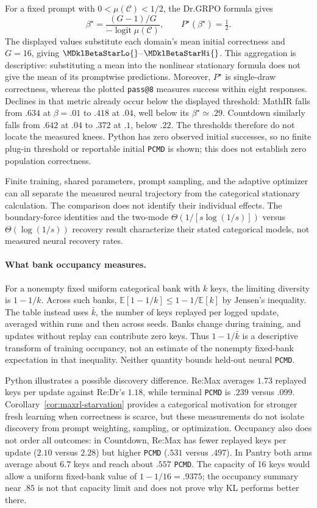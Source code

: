 \documentclass{article}
\newcommand{\1}{\mathbf 1}
\newcommand{\E}{\mathbb E}
\newcommand{\pmd}{\texttt{PCMD}}
\theoremstyle{remark}
\theoremstyle{definition}
\theoremstyle{plain}
\begin{document}
For a fixed prompt with $0<\mu(\mathcal C)<1/2$, the Dr.GRPO formula gives
\[
  \beta^\star=\frac{(G-1)/G}{-\operatorname{logit}\mu(\mathcal C)},
  \qquad P^\star(\beta^\star)=\tfrac12.
\]
The displayed values substitute each domain's mean initial correctness
and $G=16$, giving $\MDklBetaStarLo{}$--$\MDklBetaStarHi{}$.
This aggregation is descriptive: substituting a mean into the nonlinear
stationary formula does not give the mean of its promptwise predictions.
Moreover, $P^\star$ is single-draw correctness, whereas the plotted
\texttt{pass@8} measures success within eight responses. Declines in that
metric already occur below the displayed threshold: MathIR falls from
$.634$ at $\beta=.01$ to $.418$ at $.04$, well below its
$\beta^\star\simeq.29$. Countdown similarly falls from $.642$ at $.04$
to $.372$ at $.1$, below $.22$. The thresholds therefore do not locate
the measured knees. Python has zero observed initial successes, so no
finite plug-in threshold or reportable initial \pmd{} is shown; this
does not establish zero population correctness.

Finite training, shared parameters, prompt sampling, and the adaptive
optimizer can all separate the measured neural trajectory from the
categorical stationary calculation. The comparison does not identify their
individual effects. The boundary-force identities and the two-mode
$\Theta(1/[s\log(1/s)])$ versus $\Theta(\log(1/s))$ recovery result
characterize their stated categorical models, not measured neural recovery
rates.

\paragraph{What bank occupancy measures.}
For a nonempty fixed uniform categorical bank with $k$ keys, the limiting
diversity is $1-1/k$. Across such banks,
$\E[1-1/k]\le1-1/\E[k]$ by Jensen's inequality. The table instead uses
$\bar k$, the number of keys replayed per logged update, averaged within
runs and then across seeds. Banks change during training, and updates
without replay can contribute zero keys. Thus $1-1/\bar k$ is a
descriptive transform of training occupancy, not an estimate of the
nonempty fixed-bank expectation in that inequality. Neither quantity
bounds held-out neural \pmd{}.

Python illustrates a possible discovery difference. Re:Max averages
$1.73$ replayed keys per update against Re:Dr's $1.18$, while terminal
\pmd{} is $.239$ versus $.099$. Corollary~\ref{cor:maxrl-starvation}
provides a categorical motivation for stronger fresh learning when
correctness is scarce, but these measurements do not isolate discovery
from prompt weighting, sampling, or optimization. Occupancy also does not
order all outcomes: in Countdown, Re:Max has fewer replayed keys per
update ($2.10$ versus $2.28$) but higher \pmd{} ($.531$ versus $.497$).
In Pantry both arms average about $6.7$ keys and reach about $.557$ \pmd{}.
The capacity of 16 keys would allow a uniform fixed-bank value of
$1-1/16=.9375$; the occupancy summary near $.85$ is not that capacity
limit and does not prove why KL performs better there.
\end{document}
